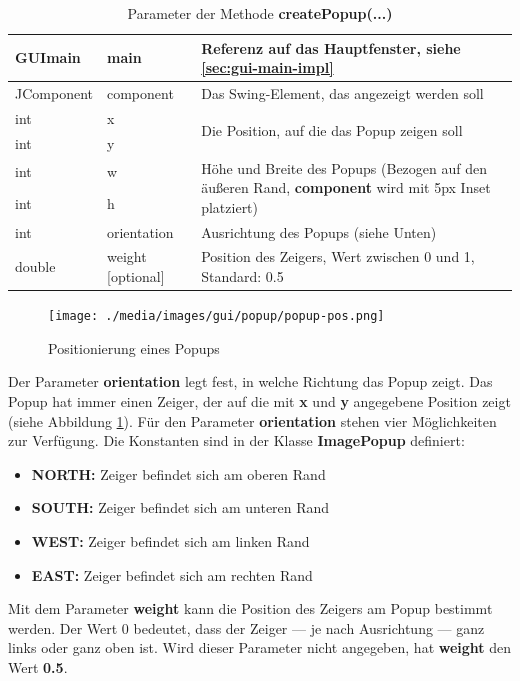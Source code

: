 \begin{table}[h!]
\begin{tabular}{|ll|l|}
\hline 
GUImain & main  & Referenz auf das Hauptfenster, siehe \ref{sec:gui-main-impl} \\
\hline
JComponent & component & Das Swing-Element, das angezeigt werden soll \\
\hline
int & x & \multirow{2}{8cm}{Die Position, auf die das Popup zeigen soll} \\
int & y & \\
\hline 
int & w & \multirow{2}{8cm}{Höhe und Breite des Popups (Bezogen auf den äußeren Rand, \textbf{component} wird mit 5px Inset platziert)} \\
int & h & \\
\hline
int & orientation & Ausrichtung des Popups (siehe Unten) \\
\hline
double & weight [optional] & Position des Zeigers, Wert zwischen 0 und 1, Standard: 0.5\\
\hline
\end{tabular}
\caption{Parameter der Methode \textbf{createPopup(...)}}
\end{table}

\begin{figure}[h!]
\centering
\texttt{[image: ./media/images/gui/popup/popup-pos.png]}
\caption{Positionierung eines Popups}\label{fig:deb-popup-pos}
\end{figure}

Der Parameter \textbf{orientation} legt fest, in welche Richtung das Popup zeigt. Das Popup hat immer einen Zeiger, der auf die mit \textbf{x} und \textbf{y} angegebene Position zeigt (siehe Abbildung \ref{fig:deb-popup-pos}). Für den Parameter \textbf{orientation} stehen vier Möglichkeiten zur Verfügung. Die Konstanten sind in der Klasse \textbf{ImagePopup} definiert:
\begin{itemize}
\item \textbf{NORTH:} Zeiger befindet sich am oberen Rand
\item \textbf{SOUTH:} Zeiger befindet sich am unteren Rand
\item \textbf{WEST:} Zeiger befindet sich am linken Rand
\item \textbf{EAST:} Zeiger befindet sich am rechten Rand
\end{itemize}

Mit dem Parameter \textbf{weight} kann die Position des Zeigers am Popup bestimmt werden. Der Wert 0 bedeutet, dass der Zeiger --- je nach Ausrichtung --- ganz links oder ganz oben ist. Wird dieser Parameter nicht angegeben, hat \textbf{weight} den Wert \textbf{0.5}.


